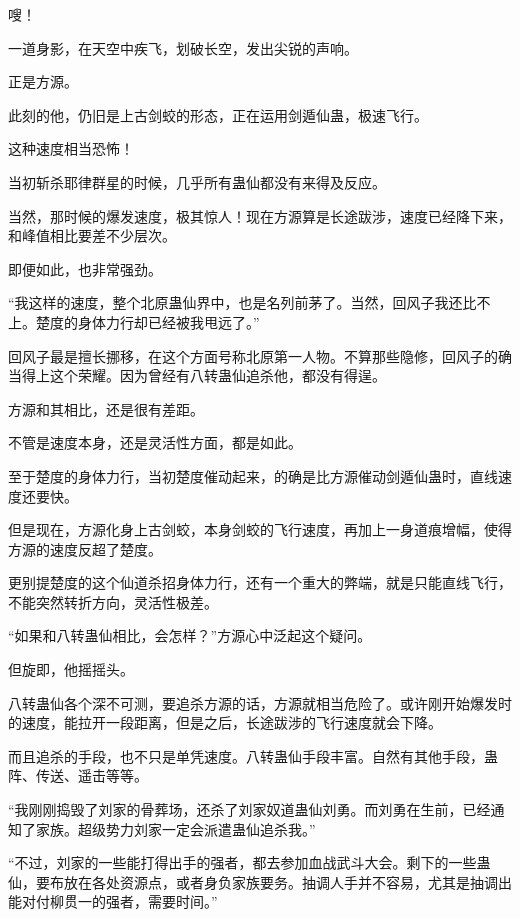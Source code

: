 
\begin{this_body}



嗖！

一道身影，在天空中疾飞，划破长空，发出尖锐的声响。

正是方源。

此刻的他，仍旧是上古剑蛟的形态，正在运用剑遁仙蛊，极速飞行。

这种速度相当恐怖！

当初斩杀耶律群星的时候，几乎所有蛊仙都没有来得及反应。

当然，那时候的爆发速度，极其惊人！现在方源算是长途跋涉，速度已经降下来，和峰值相比要差不少层次。

即便如此，也非常强劲。

“我这样的速度，整个北原蛊仙界中，也是名列前茅了。当然，回风子我还比不上。楚度的身体力行却已经被我甩远了。”

回风子最是擅长挪移，在这个方面号称北原第一人物。不算那些隐修，回风子的确当得上这个荣耀。因为曾经有八转蛊仙追杀他，都没有得逞。

方源和其相比，还是很有差距。

不管是速度本身，还是灵活性方面，都是如此。

至于楚度的身体力行，当初楚度催动起来，的确是比方源催动剑遁仙蛊时，直线速度还要快。

但是现在，方源化身上古剑蛟，本身剑蛟的飞行速度，再加上一身道痕增幅，使得方源的速度反超了楚度。

更别提楚度的这个仙道杀招身体力行，还有一个重大的弊端，就是只能直线飞行，不能突然转折方向，灵活性极差。

“如果和八转蛊仙相比，会怎样？”方源心中泛起这个疑问。

但旋即，他摇摇头。

八转蛊仙各个深不可测，要追杀方源的话，方源就相当危险了。或许刚开始爆发时的速度，能拉开一段距离，但是之后，长途跋涉的飞行速度就会下降。

而且追杀的手段，也不只是单凭速度。八转蛊仙手段丰富。自然有其他手段，蛊阵、传送、遥击等等。

“我刚刚捣毁了刘家的骨葬场，还杀了刘家奴道蛊仙刘勇。而刘勇在生前，已经通知了家族。超级势力刘家一定会派遣蛊仙追杀我。”

“不过，刘家的一些能打得出手的强者，都去参加血战武斗大会。剩下的一些蛊仙，要布放在各处资源点，或者身负家族要务。抽调人手并不容易，尤其是抽调出能对付柳贯一的强者，需要时间。”


\end{this_body}
